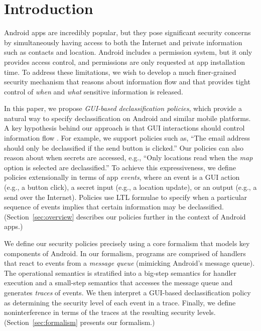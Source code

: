 \documentclass{entcs} \usepackage{entcsmacro}
\begin{document}
\section{Introduction}
\label{sec:introduction}

Android apps are incredibly popular, but they pose significant
security concerns by simultaneously having access to both the Internet
and private information such as contacts and location.  Android
includes a permission system, but it only provides access control, and
permissions are only requested at app installation time. To address
these limitations, we wish to develop a much finer-grained security
mechanism that reasons about information flow and that provides tight
control of \emph{when} and \emph{what} sensitive information is
released.

In this paper, we propose \emph{GUI-based declassification policies},
which provide a natural way to specify declassification on Android and
similar mobile platforms. A key hypothesis behind our approach is that
GUI interactions should control information flow
\cite{Roesner:12,Chen:13}. For example, we support policies such as,
``The email address should only be declassified if the send button is
clicked.''  Our policies can also reason about when secrets are
accessed, e.g., ``Only locations read when the \emph{map} option is
selected are declassified.'' To achieve this expressiveness, we define
policies extensionally in terms of app \emph{events}, where an event
is a GUI action (e.g., a button click), a secret input (e.g., a
location update), or an output (e.g., a send over the
Internet). Policies use LTL formulae \cite{Pnueli:1977} to
specify when a particular sequence of events implies that certain
information may be declassified. (Section~\ref{sec:overview} describes
our policies further in the context of Android apps.)

We define our security policies precisely using a core formalism that
models key components of Android. In our formalism, programs are
comprised of handlers that react to events from a \emph{message queue}
(mimicking Android's message queue). The operational semantics is
stratified into a big-step semantics for handler execution and a
small-step semantics that accesses the message queue and generates
\emph{traces} of events. We then interpret a GUI-based
declassification policy as determining the security level of each
event in a trace. Finally, we define noninterference in terms of the
traces at the resulting security levels.  (Section~\ref{sec:formalism}
presents our formalism.)
\end{document}
